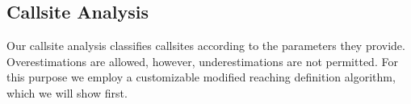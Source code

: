 % 

\subsection{Callsite Analysis}
\label{section:callsiteanalysis}
Our callsite analysis classifies callsites according to the parameters they provide. Overestimations are allowed, however,
underestimations are not permitted. For this purpose we employ a customizable modified reaching definition algorithm, 
which we will show first. 

